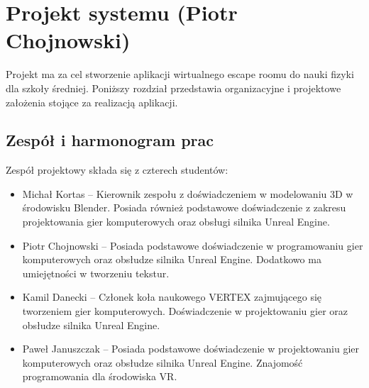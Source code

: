 \chapter{Projekt systemu (Piotr Chojnowski)}
\label{chap:project}

Projekt ma za cel stworzenie aplikacji wirtualnego escape roomu do nauki fizyki dla szkoły średniej. Poniższy rozdział przedstawia organizacyjne i projektowe założenia stojące za realizacją aplikacji.

\section{Zespół i harmonogram prac}
Zespół projektowy składa się z czterech studentów:

\begin{itemize} 
    \item Michał Kortas -- Kierownik zespołu z doświadczeniem w modelowaniu 3D w środowisku Blender. Posiada również podstawowe doświadczenie z zakresu projektowania gier komputerowych oraz obsługi silnika Unreal Engine.
    \newline
    \item Piotr Chojnowski -- Posiada podstawowe doświadczenie w programowaniu gier komputerowych oraz obsłudze silnika Unreal Engine. Dodatkowo ma umiejętności w tworzeniu tekstur.
    \newline
    \item Kamil Danecki -- Członek koła naukowego VERTEX zajmującego się tworzeniem gier komputerowych. Doświadczenie w projektowaniu gier oraz obsłudze silnika Unreal Engine.
    \newline
    \item Paweł Januszczak -- Posiada podstawowe doświadczenie w projektowaniu gier komputerowych oraz obsłudze silnika Unreal Engine. Znajomość programowania dla środowiska VR.
\end{itemize}
\hfill
\newline

